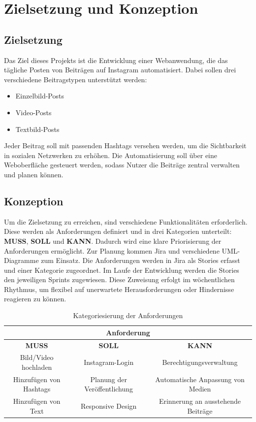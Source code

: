 \chapter{Zielsetzung und Konzeption}
\label{sec:chapter1}

\section{Zielsetzung}
\label{sec:chapter1-1}

Das Ziel dieses Projekts ist die Entwicklung einer Webanwendung, die das tägliche Posten von Beiträgen auf Instagram automatisiert. Dabei sollen drei verschiedene 
Beitragstypen unterstützt werden:

\begin{itemize}
    \item Einzelbild-Posts
    \item Video-Posts
    \item Textbild-Posts
\end{itemize}

Jeder Beitrag soll mit passenden Hashtags versehen werden, um die Sichtbarkeit in sozialen Netzwerken zu erhöhen. Die Automatisierung soll über eine Weboberfläche 
gesteuert werden, sodass Nutzer die Beiträge zentral verwalten und planen können.

\section{Konzeption}
\label{sec:chapter1-2}

Um die Zielsetzung zu erreichen, sind verschiedene Funktionalitäten erforderlich. Diese werden als Anforderungen definiert und in drei Kategorien unterteilt: 
\textbf{MUSS}, \textbf{SOLL} und \textbf{KANN}. Dadurch wird eine klare Priorisierung der Anforderungen ermöglicht. Zur Planung kommen Jira und verschiedene 
UML-Diagramme zum Einsatz. Die Anforderungen werden in Jira als Stories erfasst und einer Kategorie zugeordnet. Im Laufe der Entwicklung werden die Stories den 
jeweiligen Sprints zugewiesen. Diese Zuweisung erfolgt im wöchentlichen Rhythmus, um flexibel auf unerwartete Herausforderungen oder Hindernisse reagieren zu können.

\begin{table}[htb]
    \centering
    \renewcommand{\arraystretch}{1.3}
    \begin{tabular}{|c|c|c|}
        \hline
        \multicolumn{3}{|c|}{\textbf{Anforderung}} \\ \hline
        \textbf{MUSS} & \textbf{SOLL} & \textbf{KANN} \\ \hline
        Bild/Video hochladen & Instagram-Login & Berechtigungsverwaltung \\ \hline
        Hinzufügen von Hashtags & Planung der Veröffentlichung & Automatische Anpassung von Medien \\ \hline
        Hinzufügen von Text & Responsive Design & Erinnerung an ausstehende Beiträge \\ \hline
    \end{tabular}
    \caption{Kategoriesierung der Anforderungen}
    \label{tab:tab-1}
\end{table}

